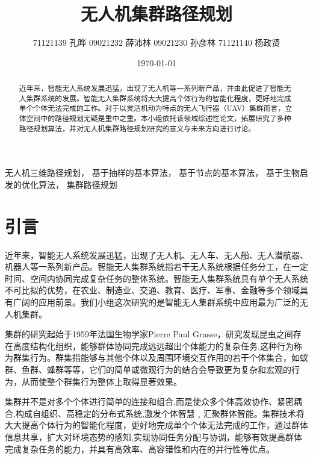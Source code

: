 \documentclass[conference]{IEEEtran}
\title{无人机集群路径规划}
\author{71121139 孔晔
    09021232 薛沛林
    09021230 孙彦林
    71121140 杨政贤}
\date{\today}
\begin{document}


\maketitle%



\begin{abstract}%

    近年来，智能无人系统发展迅猛，出现了无人机等一系列新产品，并由此促进了智能无人集群系统的发展。智能无人集群系统将大大提高个体行为的智能化程度，更好地完成单个个体无法完成的工作。对于以灵活机动为特点的无人飞行器（UAV）集群而言，立体空间中的路径规划无疑是重中之重。本小组依托该领域综述性论文，拓展研究了多种路径规划算法，并对无人机集群路径规划研究的意义与未来方向进行讨论。

\end{abstract}




\begin{IEEEkeywords}%

    无人机三维路径规划，
    基于抽样的基本算法，
    基于节点的基本算法，
    基于生物启发的优化算法，
    集群路径规划

\end{IEEEkeywords}


\section{引言}%

近年来，智能无人系统发展迅猛，出现了无人机、无人车、无人船、无人潜航器、机器人等一系列新产品。智能无人集群系统指若干无人系统根据任务分工，在一定时间、空间内协同完成复杂任务的整体系统。智能无人集群系统具有单个无人系统不可比拟的优势，在农业、制造业、交通、教育、医疗、军事、金融等多个领域具有广阔的应用前景。我们小组这次研究的是智能无人集群系统中应用最为广泛的无人机集群。

集群的研究起始于1959年法国生物学家Pierre Paul Grasse，研究发现昆虫之间存在高度结构化组织，能够群体协同完成远远超出个体能力的复杂任务,这种行为称为群集行为。群集指能够与其他个体以及周围环境交互作用的若干个体集合，如蚁群、鱼群、蜂群等等，它们的简单或微观行为的结合会导致更为复杂和宏观的行为，从而使整个群集行为整体上取得显著效果。

集群并不是对多个个体进行简单的连接和组合,而是使众多个体高效协作、紧密耦合,构成自组织、高稳定的分布式系统,激发个体智慧﹐汇聚群体智能。集群技术将大大提高个体行为的智能化程度，更好地完成单个个体无法完成的工作，通过群体信息共享，扩大对环境态势的感知,实现协同任务分配与协调，能够有效提高群体完成复杂任务的能力，并具有高效率、高容错性和内在的并行性等优点。
\end{document}
